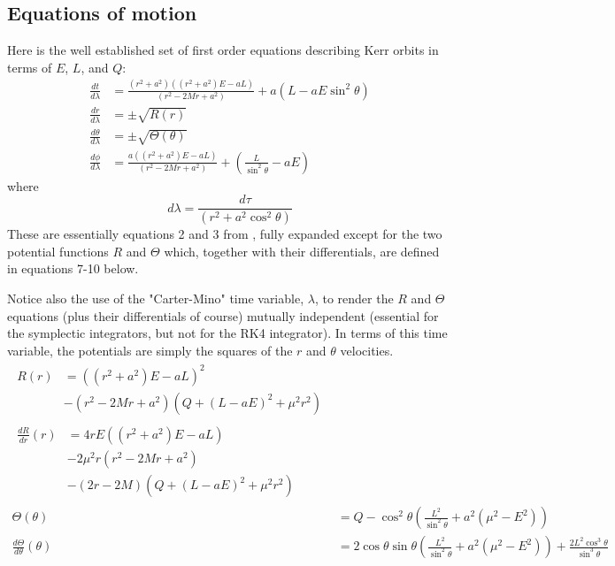 \documentclass[11pt]{article}
\begin{document}
\subsection {Equations of motion}

Here is the well established set of first order equations describing Kerr orbits in terms of $E$, $L$, and $Q$:
\begin{align}
\frac{d t}{d \lambda} &= \frac{(r^2 + a^2) \left((r^2 + a^2) E - aL \right)} {(r^2 - 2Mr  + a^2)} + a(L - aE \sin^2 \theta) \\
\frac{d r}{d \lambda} &= \pm \sqrt {R(r)} \\
\frac{d \theta}{d \lambda} &= \pm \sqrt {\Theta (\theta)} \\
\frac{d \phi}{d \lambda} &= \frac{a \left((r^2 + a^2) E - aL \right)} {(r^2 - 2Mr  + a^2)} + \left(\frac {L} {\sin^2 \theta} -aE \right)
\end{align}
where
\begin{equation}
d \lambda = \frac {d \tau} {(r^2 + a^2 \cos^2\theta)}
\end{equation}
These are essentially equations 2 and 3 from \cite{wilkins}, fully expanded except for the two potential functions $R$ and $\Theta$ which, together with their differentials, are defined in equations 7-10 below.

Notice also the use of the "Carter-Mino" time variable, $\lambda$, to render the $R$ and $\Theta$ equations (plus their differentials of course) mutually independent (essential for the symplectic integrators, but not for the RK4 integrator).
In terms of this time variable, the potentials are simply the squares of the $r$ and $\theta$ velocities.
\begin{align}
   \begin{split}
    R(r) &= \left((r^2 + a^2) E - aL \right)^2 \label{eq:1}\\
    &- (r^2 - 2Mr  + a^2) \left(Q + ( L - aE)^2 + \mu^2 r^2 \right)
   \end{split}\\
   \begin{split}
    \frac{d R}{d r} (r) &= 4rE \left((r^2 + a^2)E - aL \right) \label{eq:2}\\
    &- 2\mu^2r(r^2 - 2Mr  + a^2)\\
    &- (2r - 2M) \left(Q + ( L - aE)^2 + \mu^2 r^2 \right)
   \end{split}\\
  \Theta (\theta) &= Q - {\cos^2 \theta } \left( \frac{L^2}{\sin^2 \theta } + a^2( \mu^2 - E^2) \right) \label{eq:3}\\
  \frac{d \Theta}{d \theta} (\theta) &= 2 \cos \theta \sin \theta \left(\frac{L^2} {\sin^2 \theta } + a^2(\mu^2 - E^2) \right) +\frac{2 L^2 \cos^3 \theta } {\sin^3 \theta } \label{eq:4}
\end{align}
\end{document}
